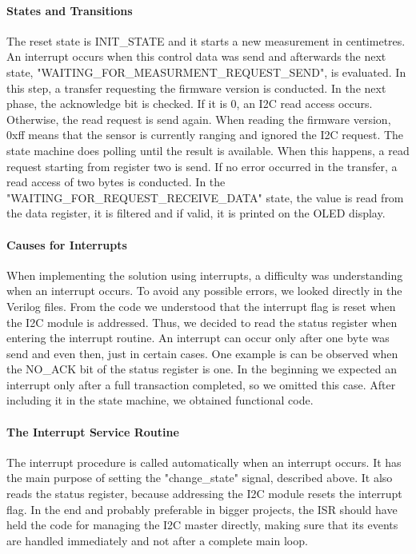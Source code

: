 			\paragraph{States and Transitions} %
			\label{par:states_and_transitions}
				The reset state is INIT\_STATE and it starts a new measurement in centimetres. An interrupt occurs when this control data was send and afterwards the next state, "WAITING\_FOR\_MEASURMENT\_REQUEST\_SEND", is evaluated. In this step, a transfer requesting the firmware version is conducted. In the next phase, the acknowledge bit is checked. If it is 0, an I2C read access occurs. Otherwise, the read request is send again. When reading the firmware version, 0xff means that the sensor is currently ranging and ignored the I2C request. The state machine does polling until the result is available. When this happens, a read request starting from register two is send. If no error occurred in the transfer, a read access of two bytes is conducted. In the "WAITING\_FOR\_REQUEST\_RECEIVE\_DATA" state, the value is read from the data register, it is filtered and if valid, it is printed on the OLED display.
			
			\paragraph{Causes for Interrupts} %
			\label{par:causes_for_interrupts}
				When implementing the solution using interrupts, a difficulty was understanding when an interrupt occurs. To avoid any possible errors, we looked directly in the Verilog files. From the code we understood that the interrupt flag is reset when the I2C module is addressed. Thus, we decided to read the status register when entering the interrupt routine. An interrupt can occur only after one byte was send and even then, just in certain cases. One example is can be observed when the NO\_ACK bit of the status register is one. In the beginning we expected an interrupt only after a full transaction completed, so we omitted this case. After including it in the state machine, we obtained functional code.  
			
			\paragraph{The Interrupt Service Routine} %
			\label{par:impl_isr}
				The interrupt procedure is called automatically when an interrupt occurs. It has the main purpose of setting the "change\_state" signal, described above. It also reads the status register, because addressing the I2C module resets the interrupt flag. In the end and probably preferable in bigger projects, the ISR should have held the code for managing the I2C master directly, making sure that its events are handled immediately and not after a complete main loop.

